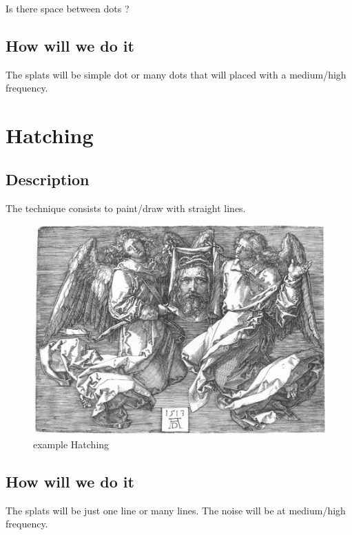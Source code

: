 \documentclass[12pt]{article}
\begin{document}
Is there space between dots ?


\subsection*{How will we do it}

The splats will be simple dot or many dots that will placed with a medium/high frequency.

\section{Hatching}

\subsection*{Description}

The technique consists to paint/draw with straight lines.

\begin{figure}[!ht]
    \begin{center}
        \includegraphics[scale=0.6]{image/hatching.jpg}
        \caption{example Hatching}
    \end{center}
\end{figure}

\subsection*{How will we do it}

The splats will be just one line or many lines. The noise will be at medium/high frequency.
\end{document}
